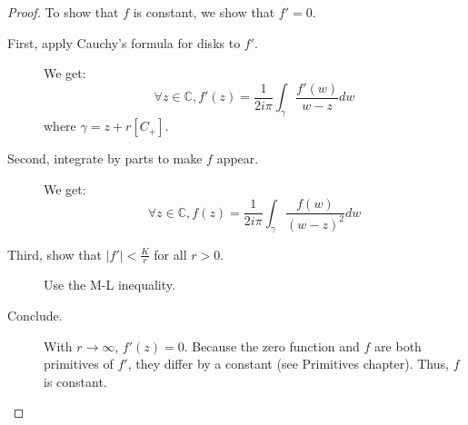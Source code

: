 \begin{proof}
    To show that $f$ is constant, we show that $f' = 0$.
    \begin{description}
        \item[First, apply Cauchy's formula for disks to $f'$.]
            We get:
            $$ \forall z\in\mathbb{C}, f'(z) = \frac{1}{2i\pi} \int_\gamma\frac{f'(w)}{w-z}dw$$
            where $\gamma = z + r[C_+]$.
        \item[Second, integrate by parts to make $f$ appear.]
            We get:
            $$ \forall z\in\mathbb{C}, f(z) = \frac{1}{2i\pi} \int_\gamma\frac{f(w)}{(w-z)^2}dw$$
        \item[Third, show that $|f'| < \frac{K}{r}$ for all $r > 0$.] Use the M-L inequality.
        \item[Conclude.] With $r\rightarrow \infty$, $f'(z) = 0$. Because the zero function and $f$ are both primitives of $f'$, they differ by a constant (see Primitives chapter). Thus, $f$ is constant.
    \end{description}
\end{proof}

